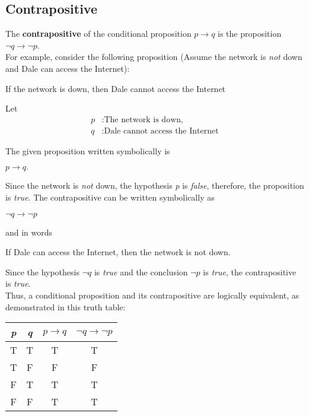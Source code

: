 \subsection*{Contrapositive}

The \textbf{contrapositive} of the conditional proposition $p \rightarrow q$ is the proposition $\lnot q \rightarrow \lnot p$.\\

For example, consider the following proposition (Assume the network is \textit{not} down and Dale can access the Internet):

\begin{center}
    If the network is down, then Dale cannot access the Internet
\end{center}

Let
\begin{align*}
    p&: \text{The network is down,}\\
    q&: \text{Dale cannot access the Internet}
\end{align*}

The given proposition written symbolically is
\begin{center}
    $p \rightarrow q.$
\end{center}

Since the network is \textit{not} down, the hypothesis \textit{p} is \textit{false}, therefore, the proposition is \textit{true}.  The contrapositive can be written symbolically as
\begin{center}
    $\lnot q \rightarrow \lnot p$
\end{center}

and in words
\begin{center}
    If Dale can access the Internet, then the network is not down.
\end{center}

Since the hypothesis $\lnot q$ is \textit{true} and the conclusion $\lnot p$ is \textit{true}, the contrapositive is \textit{true}.\\

Thus, a conditional proposition and its contrapositive are logically equivalent, as demonstrated in this truth table:

\begin{table}[h]
\centering
\begin{tabular}{|c|c|c|c|}
\hline
\textit{p} & \textit{q} & $p \rightarrow q$ & $\lnot q \rightarrow \lnot p$ \\ \hline
T & T & T & T \\ \hline
T & F & F & F \\ \hline
F & T & T & T \\ \hline
F & F & T & T \\ \hline
\end{tabular}
\end{table}


























